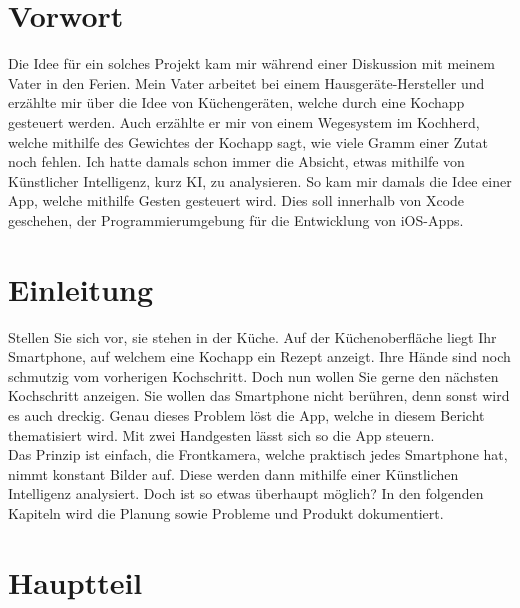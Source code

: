 \documentclass[12pt]{article}
\begin{document}
\section{Vorwort}
Die Idee für ein solches Projekt kam mir während einer Diskussion mit meinem Vater in den Ferien. Mein Vater arbeitet bei einem Hausgeräte-Hersteller und erzählte mir über die Idee von Küchengeräten, welche durch eine Kochapp gesteuert werden. Auch erzählte er mir von einem Wegesystem im Kochherd, welche mithilfe des Gewichtes der Kochapp sagt, wie viele Gramm einer Zutat noch fehlen. Ich hatte damals schon immer die Absicht, etwas mithilfe von Künstlicher Intelligenz, kurz KI, zu analysieren. So kam mir damals die Idee einer App, welche mithilfe Gesten gesteuert wird. Dies soll innerhalb von Xcode geschehen, der Programmierumgebung für die Entwicklung von iOS-Apps.

\section{Einleitung}
Stellen Sie sich vor, sie stehen in der Küche. Auf der Küchenoberfläche liegt Ihr Smartphone, auf welchem eine Kochapp ein Rezept anzeigt. Ihre Hände sind noch schmutzig vom vorherigen Kochschritt. Doch nun wollen Sie gerne den nächsten Kochschritt anzeigen. Sie wollen das Smartphone nicht berühren, denn sonst wird es auch dreckig. Genau dieses Problem löst die App, welche in diesem Bericht thematisiert wird. Mit zwei Handgesten lässt sich so die App steuern.\\ Das Prinzip ist einfach, die Frontkamera, welche praktisch jedes Smartphone hat, nimmt konstant Bilder auf. Diese werden dann mithilfe einer Künstlichen Intelligenz analysiert. Doch ist so etwas überhaupt möglich? In den folgenden Kapiteln wird die Planung sowie Probleme und Produkt dokumentiert. 


\section{Hauptteil}
\end{document}
